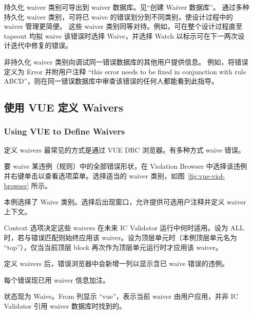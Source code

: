 持久化 waiver 类别可导出到 waiver 数据库。见``创建 Waiver 数据库''。
通过多种持久化 waiver 类别，可将已 waive 的错误划分到不同类别，使设计过程中的 waiver 管理更简便。
这些 waiver 类别同等对待。例如，可在整个设计过程直至 tapeout 均拟 waive 该错误时选择 Waive，并选择 Watch 以标示可在下一两次设计迭代中修复的错误。

非持久化 waiver 类别向调试同一错误数据库的其他用户提供信息。
例如，将错误定义为 Error 并附用户注释 ``this error needs to be fixed in conjunction with rule ABCD''，则在同一错误数据库中审查该错误的任何人都能看到此指导。

\subsection{使用 VUE 定义 Waivers}
\subsubsection*{Using VUE to Define Waivers}

定义 waivers 最常见的方式是通过 VUE DRC 浏览器。有多种方式 waive 错误。

要 waive 某违例（规则）中的全部错误形状，在 Violation Browser 中选择该违例并右键单击以查看选项菜单。选择适当的 waiver 类别，如图~\ref{fig:vue-viol-browser} 所示。


本例选择了 Waive 类别。选择后出现窗口，允许提供可选用户注释并定义 waiver 上下文。


Context 选项决定这些 waivers 在未来 IC Validator 运行中何时适用。设为 ALL 时，若与错误匹配则始终应用该 waiver。设为顶层单元时（本例顶层单元名为 ``top''），仅当当前顶层 block 再次作为顶层单元运行时才应用该 waiver。

定义 waivers 后，错误浏览器中会新增一列以显示含已 waive 错误的违例。


每个错误现已用 waiver 信息加注。


状态现为 Waive。From 列显示 ``vue''，表示当前 waiver 由用户应用，并非 IC Validator 引用 waiver 数据库时找到的。

